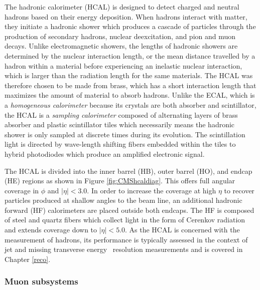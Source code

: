 The hadronic calorimeter (HCAL) is designed to detect charged and neutral hadrons based on their energy deposition. When hadrons interact with matter, they initiate a hadronic shower which produces a cascade of particles through the production of secondary hadrons, nuclear deexcitation, and pion and muon decays. Unlike electromagnetic showers, the lengths of hadronic showers are determined by the nuclear interaction length, or the mean distance travelled by a hadron within a material before experiencing an inelastic nuclear interaction, which is larger than the radiation length for the same materials. The HCAL was therefore chosen to be made from brass, which has a short interaction length that maximizes the amount of material to absorb hadrons. Unlike the ECAL, which is a \textit{homogeneous calorimeter} because its crystals are both absorber and scintillator, the HCAL is a \textit{sampling calorimeter} composed of alternating layers of brass absorber and plastic scintillator tiles which necessarily means the hadronic shower is only sampled at discrete times during its evolution. The scintillation light is directed by wave-length shifting fibers embedded within the tiles to hybrid photodiodes which produce an amplified electronic signal.

The HCAL is divided into the inner barrel (HB), outer barrel (HO), and endcap (HE) regions as shown in Figure \ref{fig:CMShcaldiag}. This offers full angular coverage in $\phi$ and $\left| \eta \right| < 3.0$. In order to increase the coverage at high $\eta$ to recover particles produced at shallow angles to the beam line, an additional hadronic forward (HF) calorimeters are placed outside both endcaps. The HF is composed of steel and quartz fibers which collect light in the form of Cerenkov radiation and extends coverage down to $\left| \eta \right| < 5.0$. As the HCAL is concerned with the measurement of hadrons, its performance is typically assessed in the context of jet and missing transverse energy \pTmiss\ resolution measurements and is covered in Chapter \ref{reco}.

\subsubsection{Muon subsystems}

